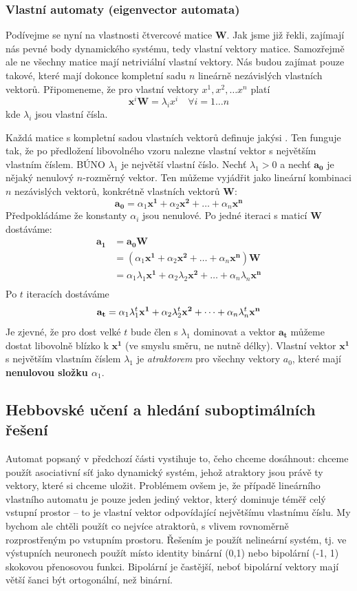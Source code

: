 \documentclass[11pt]{report} %
\renewcommand{\vec}[1]{\mathbf{#1}}
\numberwithin{equation}{section}
\begin{document}
\subsubsection{Vlastní automaty (eigenvector automata)}
Podívejme se nyní na vlastnosti čtvercové matice $\vec{W}$. Jak jsme již řekli, zajímají nás pevné body dynamického systému, tedy vlastní vektory matice. Samozřejmě ale ne všechny matice mají netriviální vlastní vektory. Nás budou zajímat pouze takové, které mají dokonce kompletní sadu $n$ lineárně nezávislých vlastních vektorů. Připomeneme, že pro vlastní vektory $x^1, x^2, \dots x^n$ platí
$$
\vec{x}^i\vec{W} = \lambda_i x^i \quad \forall i = 1 \dots n
$$
kde $\lambda_i$ jsou vlastní čísla.

Každá matice s kompletní sadou vlastních vektorů definuje jakýsi . Ten funguje tak, že po předložení libovolného vzoru nalezne vlastní vektor s největším vlastním číslem. BÚNO $\lambda_1$ je největší vlastní číslo. Nechť $\lambda_1 > 0$ a nechť $\vec{a_0}$ je nějaký nenulový $n$-rozměrný vektor. Ten můžeme vyjádřit jako lineární kombinaci $n$ nezávislých vektorů, konkrétně vlastních vektorů $\vec{W}$:
$$\vec{a_0} = \alpha_1\vec{x^1} + \alpha_2\vec{x^2} + \dots + \alpha_n\vec{x^n}$$ 
Předpokládáme že konstanty $\alpha_i$ jsou nenulové. Po jedné iteraci s maticí $\vec{W}$ dostáváme:
\begin{align*}
\vec{a_1} &= \vec{a_0}\vec{W} \\
&= (\alpha_1\vec{x^1} + \alpha_2\vec{x^2} + \dots + \alpha_n\vec{x^n})\vec{W} \\
&= \alpha_1\lambda_1\vec{x^1} + \alpha_2\lambda_2\vec{x^2} + \dots + \alpha_n\lambda_n\vec{x^n}\\
\end{align*}
Po $t$ iteracích dostáváme
$$\vec{a_t} = \alpha_1\lambda_1^t\vec{x^1} + \alpha_2\lambda_2^t\vec{x^2} + \dots + \alpha_n\lambda_n^t\vec{x^n}\\$$
Je zjevné, že pro dost velké $t$ bude člen s $\lambda_1$ dominovat a vektor $\vec{a_t}$ můžeme dostat libovolně blízko k $\vec{x^1}$ (ve smyslu směru, ne nutně délky). Vlastní vektor $\vec{x^1}$ s největším vlastním číslem $\lambda_1$ je \textit{atraktorem} pro všechny vektory $a_0$, které mají \textbf{nenulovou složku $\alpha_1$}.

\subsection{Hebbovské učení a hledání suboptimálních řešení}
Automat popsaný v předchozí části vystihuje to, čeho chceme dosáhnout: chceme použít asociativní síť jako dynamický systém, jehož atraktory jsou právě ty vektory, které si chceme uložit. Problémem ovšem je, že případě lineárního vlastního automatu je pouze jeden jediný vektor, který dominuje téměř celý vstupní prostor -- to je vlastní vektor odpovídající největšímu vlastnímu číslu. My bychom ale chtěli použít co nejvíce atraktorů, s vlivem rovnoměrně rozprostřeným po vstupním prostoru. Řešením je použít nelineární systém, tj. ve výstupních neuronech použít místo identity binární (0,1) nebo bipolární (-1, 1) skokovou přenosovou funkci. Bipolární je častější, neboť bipolární vektory mají větší šanci být ortogonální, než binární. 
\end{document}
